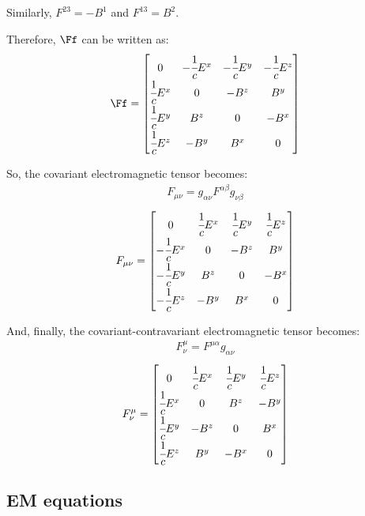   Similarly, $F^{23} = -B^1$ and $F^{13} = B^2$.

  Therefore, $\Ff$ can be written as:
  \begin{align}
    \Ff =
    \begin{bmatrix}
      0 & -\cfrac{1}{c}E^x & -\cfrac{1}{c}E^y & -\cfrac{1}{c}E^z \\
      \cfrac{1}{c}E^x & 0 & -B^z & B^y \\
      \cfrac{1}{c}E^y & B^z & 0 & -B^x \\
      \cfrac{1}{c}E^z & -B^y & B^x & 0
    \end{bmatrix}
  \end{align}

  So, the covariant electromagnetic tensor becomes:
  \begin{align}
    F_{\mu\nu} = g_{\alpha\nu}F^{\alpha\beta}g_{\nu\beta}
  \end{align}
  \begin{align}
    F_{\mu\nu} =
        \begin{bmatrix}
          0 & \cfrac{1}{c}E^x & \cfrac{1}{c}E^y & \cfrac{1}{c}E^z \\
          -\cfrac{1}{c}E^x & 0 & -B^z & B^y \\
          -\cfrac{1}{c}E^y & B^z & 0 & -B^x \\
          -\cfrac{1}{c}E^z & -B^y & B^x & 0
        \end{bmatrix}
  \end{align}

  And, finally, the covariant-contravariant electromagnetic tensor becomes:
  \begin{align}
    F^\mu_\nu = F^{\mu \alpha} g_{\alpha\nu}
  \end{align}
  \begin{align}
    F^\mu_\nu =
        \begin{bmatrix}
          0 & \cfrac{1}{c}E^x & \cfrac{1}{c}E^y & \cfrac{1}{c}E^z \\
          \cfrac{1}{c}E^x & 0 & B^z & -B^y \\
          \cfrac{1}{c}E^y & -B^z & 0 & B^x \\
          \cfrac{1}{c}E^z & B^y & -B^x & 0
        \end{bmatrix}
  \end{align}

\subsection{EM equations}

